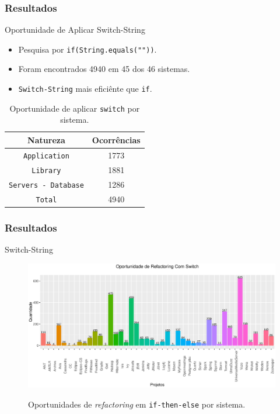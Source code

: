 \documentclass[]{beamer}
\begin{document}
	\begin{frame}[fragile, label=re]\frametitle{Resultados}
		\begin{block}{Oportunidade de Aplicar Switch-String}
			\begin{itemize}
				\item Pesquisa por \texttt{if(String.equals(""))}.
				\item Foram encontrados 4940 em 45 dos 46 sistemas.
				\item \texttt{Switch-String} mais eficiênte que \texttt{if}.
			\end{itemize}
			
			\begin{table}[h]
				\centering
				\caption{Oportunidade de aplicar \texttt{switch} por sistema.}
				\begin{tabular}{cc}
					\hline
					Natureza & Ocorrências \\ 
					\hline \hline
					\texttt{Application} & 1773 \\ 
					\texttt{Library} & 1881 \\ 
					\texttt{Servers - Database} & 1286 \\ \hline
					\texttt{Total} & 4940 \\ \hline
				\end{tabular}
				\label{tab:oportunidadesSwitchPorNatureza} %
			\end{table}
			
		\end{block}
	\end{frame}
	
	\begin{frame}[fragile, label=re]\frametitle{Resultados}
		\begin{block}{Switch-String}
			\begin{figure}[h]
				\center
				\includegraphics[scale=0.30]{../TCC/Imagens/oportunidadesSwitchString}
				\label{fig:oportunidadesSwitchString}
				\caption{Oportunidades de \textit{refactoring} em \texttt{if-then-else} por sistema.}
			\end{figure}		
		\end{block}
	\end{frame}
	
\end{document}

